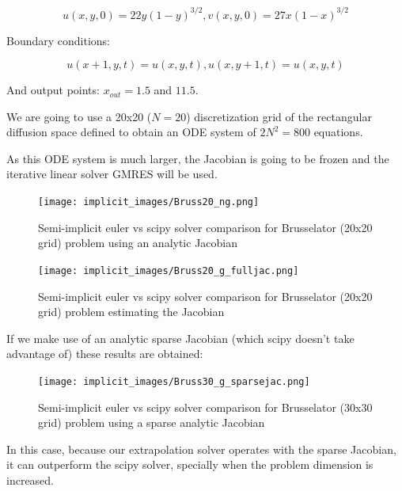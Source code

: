 \documentclass[12pt]{article}
\begin{document}
$$u(x,y,0)=22y(1-y)^{3/2}, v(x,y,0)=27x(1-x)^{3/2}$$

Boundary conditions:

$$u(x+1,y,t)=u(x,y,t), u(x,y+1,t)=u(x,y,t)$$

And output points: $x_{out}=1.5$ and $11.5$.

We are going to use a 20x20 ($N=20$) discretization grid of the rectangular diffusion space defined to obtain an ODE system of $2N^{2}=800$ equations.

As this ODE system is much larger, the Jacobian is going to be frozen and the iterative linear solver GMRES will be used.

\begin{figure}[h]
 \texttt{[image: implicit\_images/Bruss20\_ng.png]}
\centering
\caption{Semi-implicit euler vs scipy solver comparison for Brusselator (20x20 grid) problem using an analytic Jacobian}
\end{figure}

\begin{figure}[h]
 \texttt{[image: implicit\_images/Bruss20\_g\_fulljac.png]}
\centering
\caption{Semi-implicit euler vs scipy solver comparison for Brusselator (20x20 grid) problem estimating the Jacobian}
\end{figure}

If we make use of an analytic sparse Jacobian (which scipy doesn't take advantage of) these results are obtained:

\begin{figure}[h]
 \texttt{[image: implicit\_images/Bruss30\_g\_sparsejac.png]}
\centering
\caption{Semi-implicit euler vs scipy solver comparison for Brusselator (30x30 grid) problem using a sparse analytic Jacobian}
\end{figure}

In this case, because our extrapolation solver operates with the sparse Jacobian, it can outperform the scipy solver, specially when the problem dimension is increased.
\end{document}
